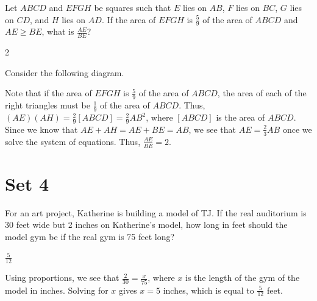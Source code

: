 \documentclass[11pt]{article}
\begin{document}
\begin{problem}
Let $ABCD$ and $EFGH$ be squares such that $E$ lies on $AB$, $F$ lies on $BC$, $G$ lies on $CD$, and $H$ lies on $AD$. If the area of $EFGH$ is $\frac{5}{9}$ of the area of $ABCD$ and $AE \geq BE$, what is $\frac{AE}{BE}$?
\end{problem}

\begin{answer}
2
\end{answer}

\begin{solution}
Consider the following diagram.
\begin{center}
\end{center}
Note that if the area of $EFGH$ is $\frac{5}{9}$ of the area of $ABCD$, the area of each of the right triangles must be $\frac{1}{9}$ of the area of $ABCD$. Thus, $(AE)(AH) = \frac{2}{9}[ABCD]=\frac{2}{9}AB^2$, where $[ABCD]$ is the area of $ABCD$. Since we know that $AE + AH = AE + BE = AB$, we see that $AE=\frac{2}{3}AB$ once we solve the system of equations. Thus, $\frac{AE}{BE} = \boxed{2}$.
\end{solution}
\newpage
\section*{Set 4}
\begin{problem}
For an art project, Katherine is building a model of TJ. If the real auditorium is 30 feet wide but 2 inches on Katherine's model, how long in feet should the model gym be if the real gym is 75 feet long?
\end{problem}

\begin{answer}
$\frac{5}{12}$
\end{answer}

\begin{solution}
Using proportions, we see that $\frac{2}{30} = \frac{x}{75}$, where $x$ is the length of the gym of the model in inches. Solving for $x$ gives $x=5$ inches, which is equal to $\boxed{\frac{5}{12}}$ feet.
\end{solution}
\end{document}
